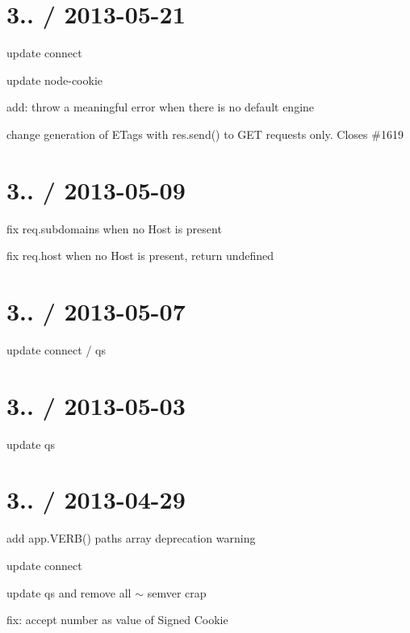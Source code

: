 \section*{3.. / 2013-\/05-\/21 }


\begin{DoxyItemize}
\item update connect
\item update node-\/cookie
\item add\+: throw a meaningful error when there is no default engine
\item change generation of E\+Tags with res.\+send() to G\+E\+T requests only. Closes \#1619
\end{DoxyItemize}

\section*{3.. / 2013-\/05-\/09 }


\begin{DoxyItemize}
\item fix {\ttfamily req.\+subdomains} when no Host is present
\item fix {\ttfamily req.\+host} when no Host is present, return undefined
\end{DoxyItemize}

\section*{3.. / 2013-\/05-\/07 }


\begin{DoxyItemize}
\item update connect / qs
\end{DoxyItemize}

\section*{3.. / 2013-\/05-\/03 }


\begin{DoxyItemize}
\item update qs
\end{DoxyItemize}

\section*{3.. / 2013-\/04-\/29 }


\begin{DoxyItemize}
\item add app.\+V\+E\+R\+B() paths array deprecation warning
\item update connect
\item update qs and remove all $\sim$ semver crap
\item fix\+: accept number as value of Signed Cookie
\end{DoxyItemize}

